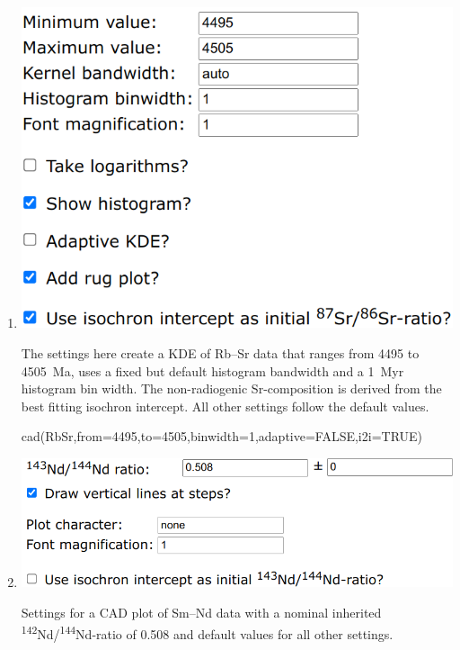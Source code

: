 \begin{refsection}
\begin{enumerate}
\item\noindent\begin{minipage}[t]{.55\linewidth}
\strut\vspace*{-\baselineskip}\newline
\includegraphics[width=\linewidth]{../figures/RbSrKDE.png}
\end{minipage}
\begin{minipage}[t]{.45\linewidth}
  The settings here create a KDE of Rb--Sr data that ranges from 4495
  to 4505~Ma, uses a fixed but default \citet{botev2010} histogram
  bandwidth and a 1~Myr histogram bin width. The non-radiogenic
  Sr-composition is derived from the best fitting isochron intercept.
  All other settings follow the default values.
\end{minipage}

\begin{console}
cad(RbSr,from=4495,to=4505,binwidth=1,adaptive=FALSE,i2i=TRUE)
\end{console}

\item\noindent\begin{minipage}[t]{.65\linewidth}
\strut\vspace*{-\baselineskip}\newline
\includegraphics[width=\linewidth]{../figures/SmNdCAD.png}
\end{minipage}
\begin{minipage}[t]{.35\linewidth}
  Settings for a CAD plot of Sm--Nd data with a nominal inherited
  \textsuperscript{142}Nd/\textsuperscript{144}Nd-ratio of 0.508
  and default values for all other settings.
\end{minipage}


\end{enumerate}
\end{refsection}
